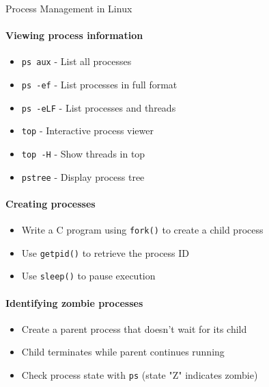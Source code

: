 \begin{KR}{Process Management in Linux}
    \paragraph{Viewing process information}
    \begin{itemize}
        \item \texttt{ps aux} - List all processes
        \item \texttt{ps -ef} - List processes in full format
        \item \texttt{ps -eLF} - List processes and threads
        \item \texttt{top} - Interactive process viewer
        \item \texttt{top -H} - Show threads in top
        \item \texttt{pstree} - Display process tree
    \end{itemize}
    
    \paragraph{Creating processes}
    \begin{itemize}
        \item Write a C program using \texttt{fork()} to create a child process
        \item Use \texttt{getpid()} to retrieve the process ID
        \item Use \texttt{sleep()} to pause execution
    \end{itemize}
    
    \paragraph{Identifying zombie processes}
    \begin{itemize}
        \item Create a parent process that doesn't wait for its child
        \item Child terminates while parent continues running
        \item Check process state with \texttt{ps} (state "Z" indicates zombie)
    \end{itemize}
\end{KR}

